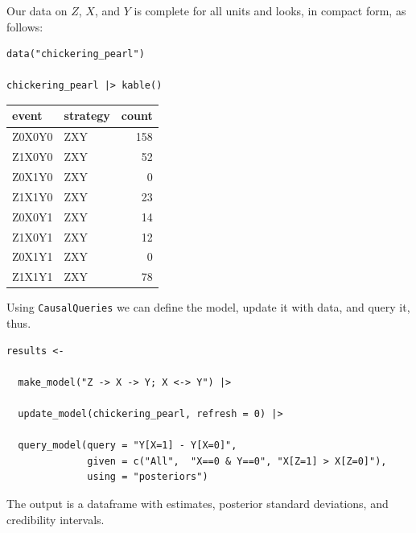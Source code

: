 \documentclass[
  article]{jss}
\begin{document}
Our data on \(Z\), \(X\), and \(Y\) is complete for all units and looks,
in compact form, as follows:

\begin{verbatim}
data("chickering_pearl")

chickering_pearl |> kable()
\end{verbatim}

\begin{longtable}[]{@{}llr@{}}
\toprule\noalign{}
event & strategy & count \\
\midrule\noalign{}
\endhead
\bottomrule\noalign{}
\endlastfoot
Z0X0Y0 & ZXY & 158 \\
Z1X0Y0 & ZXY & 52 \\
Z0X1Y0 & ZXY & 0 \\
Z1X1Y0 & ZXY & 23 \\
Z0X0Y1 & ZXY & 14 \\
Z1X0Y1 & ZXY & 12 \\
Z0X1Y1 & ZXY & 0 \\
Z1X1Y1 & ZXY & 78 \\
\end{longtable}

Using \texttt{CausalQueries} we can define the model, update it with
data, and query it, thus.

\begin{verbatim}
results <- 
  
  make_model("Z -> X -> Y; X <-> Y") |>
  
  update_model(chickering_pearl, refresh = 0) |>
  
  query_model(query = "Y[X=1] - Y[X=0]",
              given = c("All",  "X==0 & Y==0", "X[Z=1] > X[Z=0]"),
              using = "posteriors") 
\end{verbatim}

The output is a dataframe with estimates, posterior standard deviations,
and credibility intervals.
\end{document}
